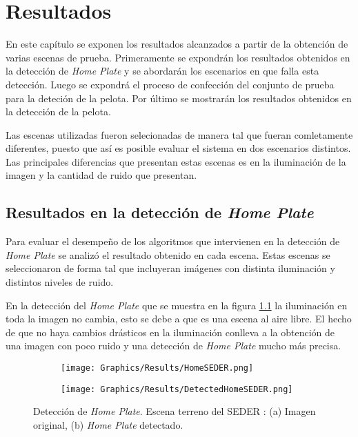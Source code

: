 \chapter{Resultados}

En este capítulo se exponen los resultados alcanzados a partir de la obtención de varias escenas de prueba. Primeramente se expondrán los resultados obtenidos en la detección de \textit{Home Plate} y se abordarán los escenarios en que falla esta detección. Luego se expondrá el proceso de confección del conjunto de prueba para la deteción de la pelota. Por último se mostrarán los resultados obtenidos en la detección de la pelota.

Las escenas utilizadas fueron selecionadas de manera tal que fueran comletamente diferentes, puesto que así es posible evaluar el sistema en dos escenarios distintos. Las principales diferencias que presentan estas escenas es en la iluminación de la imagen y la cantidad de ruido que presentan.

\section{Resultados en la detección de \textit{Home Plate}}

Para evaluar el desempeño de los algoritmos que intervienen en la detección de \textit{Home Plate} se analizó el resultado obtenido en cada escena. Estas escenas se seleccionaron de forma tal que incluyeran imágenes con distinta iluminación y distintos niveles de ruido.

En la detección del \textit{Home Plate} que se muestra en la figura \ref{fig:DetectedHomeSEDER} la iluminación en toda la imagen no cambia, esto se debe a que es una escena al aire libre. El hecho de que no haya cambios drásticos en la iluminación conlleva a la obtención de una imagen con poco ruido y una detección de \textit{Home Plate} mucho más precisa.

\begin{figure}[h!]
    \centering
    \begin{subfigure}[b]{0.32\linewidth}
        \texttt{[image: Graphics/Results/HomeSEDER.png]}
        \caption{}
    \end{subfigure}
    \begin{subfigure}[b]{0.32\linewidth}
        \texttt{[image: Graphics/Results/DetectedHomeSEDER.png]}
        \caption{}
    \end{subfigure}
    \caption{Detección de \textit{Home Plate}. Escena terreno del SEDER : (a) Imagen original, (b)\textit{ Home Plate} detectado.}
    \label{fig:DetectedHomeSEDER}
\end{figure}

